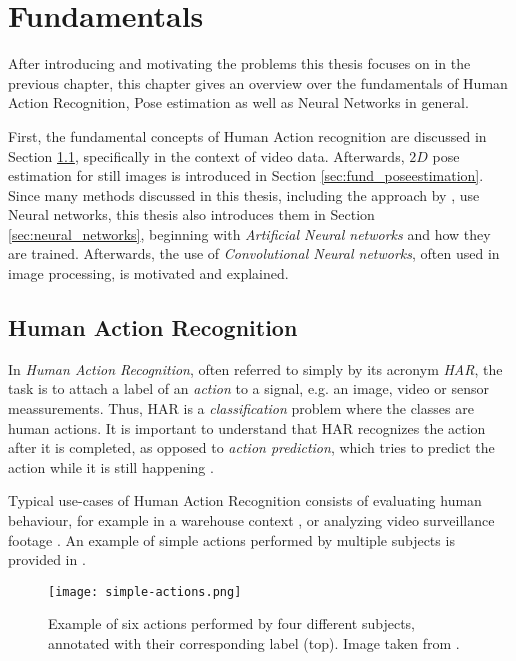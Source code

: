 \chapter{Fundamentals}
\label{sec:chapter2}
After introducing and motivating the problems this thesis focuses on in the previous chapter, this chapter gives an overview over the fundamentals of Human Action Recognition, Pose estimation as well as Neural Networks in general.

First, the fundamental concepts of Human Action recognition are discussed in Section \ref{sec:fund_har}, specifically in the context of video data.
Afterwards, $2D$ pose estimation for still images is introduced in Section \ref{sec:fund_poseestimation}.
Since many methods discussed in this thesis, including the approach by \cite{luvizon_2d/3d_2018}, use Neural networks, this thesis also introduces them in Section \ref{sec:neural_networks}, beginning with \textit{Artificial Neural networks} and how they are trained.
Afterwards, the use of \textit{Convolutional Neural networks}, often used in image processing, is motivated and explained.

\section{Human Action Recognition}
\label{sec:fund_har}
In \textit{Human Action Recognition}, often referred to simply by its acronym \textit{HAR}, the task is to attach a label of an \textit{action} to a signal, e.g. an image, video or sensor meassurements.
Thus, HAR is a \textit{classification} problem where the classes are human actions.
It is important to understand that HAR recognizes the action after it is completed, as opposed to \textit{action prediction}, which tries to predict the action while it is still happening \cite{kong_human_2018}.

Typical use-cases of Human Action Recognition consists of evaluating human behaviour, for example in a warehouse context \cite{reining_towards_2018}, or analyzing video surveillance footage \cite{htike_human_2014}.
An example of simple actions performed by multiple subjects is provided in .

\begin{figure}[htb!]
    \centering
    \texttt{[image: simple-actions.png]}
    \caption{Example of six actions performed by four different subjects, annotated with their corresponding label (top). Image taken from \cite{laptev_learning_2008}. }
    \label{fig:simple-actions}
\end{figure}

